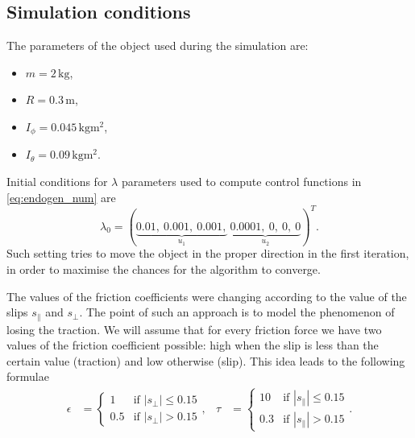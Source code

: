 \subsection{Simulation conditions}
\label{sec:discont_params_uni}
The parameters of the object used during the simulation are:
\begin{multicols}{2}
\begin{itemize}
\item $m=2 \,\mathrm{kg}$,
\item $R=0.3 \,\mathrm{m}$,
\item $I_\phi =0.045\,\mathrm{kgm^2}$,
\item $I_\theta =0.09\,\mathrm{kgm^2}$. 
\end{itemize}
\end{multicols}
Initial conditions for $\lambda$ parameters used to compute control functions
in \eqref{eq:endogen_num} are
\begin{equation}
\lambda_0=
(\underbrace{0.01, \ 0.001, \ 0.001,}_{u_1}\ \underbrace{0.0001, \ 0, \ 0, \ 0}_{u_2})^T.
\end{equation}
Such setting tries to move the object in the proper direction in the first iteration, in order to
maximise the chances for the algorithm to converge.

The values of the friction coefficients were changing according to the value of the slips $s_\parallel$
and $s_\perp$. 
The point of such an approach is to model the phenomenon
of losing the traction. We will assume that for every friction force we have two
values of the friction coefficient possible: high when the slip is less than the certain
value (traction) and low otherwise (slip). This idea leads to the following formulae
\begin{equation*}
\begin{aligned}
\epsilon&=\begin{cases}
1 &\mbox{if } |s_\perp| \leq 0.15 \\
0.5 &\mbox{if } |s_\perp| > 0.15
\end{cases}, &
\tau&=\begin{cases}
10 &\mbox{if } |s_\parallel| \leq 0.15 \\
0.3 &\mbox{if } |s_\parallel| > 0.15
\end{cases}.
\end{aligned}
\end{equation*}


